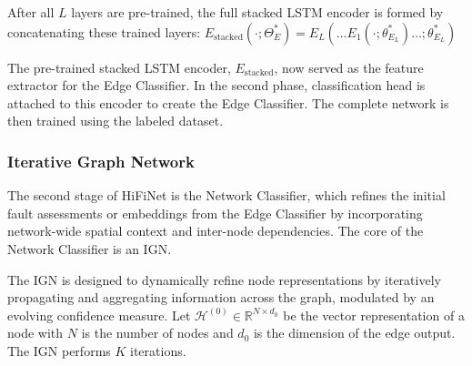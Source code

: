  After all \(L\) layers are pre-trained, the full stacked LSTM encoder is formed by concatenating these trained layers: \(E_\text{stacked}(\cdot; \Theta^*_{E}) = E_L(\ldots E_1(\cdot; \theta^*_{E_L}) \ldots;\theta^*_{E_L})\)
  
The pre-trained stacked LSTM encoder, \(E_\text{stacked}\), now served as the feature extractor for the Edge Classifier. In the second phase, classification head is attached to this encoder to create the Edge Classifier. The complete network is then trained using the labeled dataset.

\subsubsection{Iterative Graph Network}
The second stage of HiFiNet is the Network Classifier, which refines the initial fault assessments or embeddings from the Edge Classifier by incorporating network-wide spatial context and inter-node dependencies. The core of the Network Classifier is an IGN.

The IGN is designed to dynamically refine node representations by iteratively propagating and aggregating information across the graph, modulated by an evolving confidence measure. Let \(\mathcal{H}^{(0)} \in \mathbb{R}^{N \times d_0}\) be the vector representation of a node with \(N\) is the number of nodes and \(d_0\) is the dimension of the edge output. The IGN performs \(K\) iterations.

